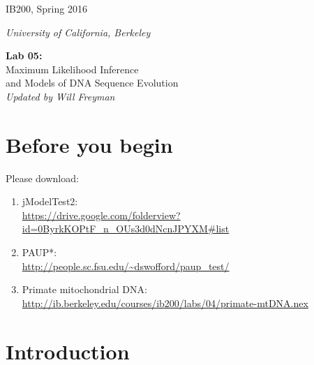 \documentclass[11pt]{article}
\begin{document}
\noindent
\large
\begin{minipage}{0.5\textwidth}
\begin{flushleft} 
IB200, Spring 2016
\end{flushleft}
\end{minipage}
\begin{minipage}{0.5\textwidth}
\begin{flushright} 
\textit{University of California, Berkeley}
\end{flushright}
\end{minipage}

\vspace{0.5cm}


\begin{center}
\Large \textbf{Lab 05:} \\
Maximum Likelihood Inference \\ and  
Models of DNA Sequence Evolution \\
\normalsize
\textit{Updated by Will Freyman}
\end{center}

\vspace{0.5cm}

\section{Before you begin}

Please download:

\begin{enumerate}
  \item jModelTest2: \\ 
        \url{https://drive.google.com/folderview?id=0ByrkKOPtF_n_OUs3d0dNcnJPYXM#list}
  \item PAUP*: \\ 
        \url{http://people.sc.fsu.edu/~dswofford/paup_test/}
  \item Primate mitochondrial DNA: \\
        \url{http://ib.berkeley.edu/courses/ib200/labs/04/primate-mtDNA.nex}
\end{enumerate}


\section{Introduction}
\end{document}
